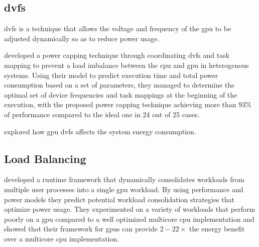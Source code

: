 		\subsection{\acrlong{dvfs}}
			\gls{dvfs} is a technique that allows the voltage and frequency of the \gls{gpu} to be adjusted dynamically so as to reduce power usage.

			\textcite{Komoda2013} developed a power capping technique through coordinating \gls{dvfs} and task mapping to prevent a load imbalance between the \gls{cpu} and \gls{gpu} in heterogenous systems.
			Using their model to predict execution time and total power consumption based on a set of parameters, they managed to determine the optimal set of device frequencies and task mappings at the beginning of the execution, with the proposed power capping technique achieving more than $93 \%$ of performance compared to the ideal one in 24 out of 25 cases.

			\textcite{Mei2013} explored how \gls{gpu} \gls{dvfs} affects the system energy consumption.
			

		\subsection{Load Balancing}
			\textcite{Li2011} developed a runtime framework that dynamically consolidates workloads from multiple user processes into a single \gls{gpu} workload.
			By using performance and power models they predict potential workload consolidation strategies that optimize power usage.
			They experimented on a variety of workloads that perform poorly on a \gls{gpu} compared to a well optimized multicore \gls{cpu} implementation and showed that their framework for \glspl{gpu} can provide $2-22 \times$ the energy benefit over a multicore \gls{cpu} implementation.